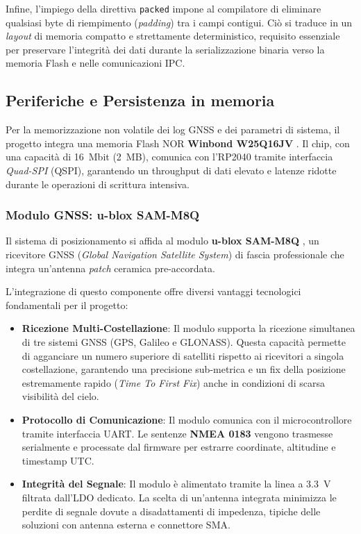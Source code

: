 Infine, l'impiego della direttiva \texttt{packed} impone al compilatore di eliminare qualsiasi byte di riempimento (\emph{padding}) tra i campi contigui. Ciò si traduce in un \emph{layout} di memoria compatto e strettamente deterministico, requisito essenziale per preservare l'integrità dei dati durante la serializzazione binaria verso la memoria Flash e nelle comunicazioni IPC.

\subsection{Periferiche e Persistenza in memoria}

Per la memorizzazione non volatile dei log GNSS e dei parametri di sistema, il progetto integra una memoria Flash NOR \textbf{Winbond W25Q16JV} \cite{w25q16_ds}. Il chip, con una capacità di \qty{16}{Mbit} (\qty{2}{MB}), comunica con l'RP2040 tramite interfaccia \textit{Quad-SPI} (QSPI), garantendo un throughput di dati elevato e latenze ridotte durante le operazioni di scrittura intensiva.

\subsubsection*{Modulo GNSS: u-blox SAM-M8Q}
Il sistema di posizionamento si affida al modulo \textbf{u-blox SAM-M8Q} \cite{sam_m8q_ds}, un ricevitore GNSS (\textit{Global Navigation Satellite System}) di fascia professionale che integra un'antenna \textit{patch} ceramica pre-accordata. 

L'integrazione di questo componente offre diversi vantaggi tecnologici fondamentali per il progetto:

\begin{itemize}
    \item \textbf{Ricezione Multi-Costellazione}: Il modulo supporta la ricezione simultanea di tre sistemi GNSS (GPS, Galileo e GLONASS). Questa capacità permette di agganciare un numero superiore di satelliti rispetto ai ricevitori a singola costellazione, garantendo una precisione sub-metrica e un fix della posizione estremamente rapido (\textit{Time To First Fix}) anche in condizioni di scarsa visibilità del cielo.
    \item \textbf{Protocollo di Comunicazione}: Il modulo comunica con il microcontrollore tramite interfaccia UART. Le sentenze \textbf{NMEA 0183} vengono trasmesse serialmente e processate dal firmware per estrarre coordinate, altitudine e timestamp UTC.
	\item \textbf{Integrità del Segnale}: Il modulo è alimentato tramite la linea a \qty{3.3}{V} filtrata dall'LDO dedicato. La scelta di un'antenna integrata minimizza le perdite di segnale dovute a disadattamenti di impedenza, tipiche delle soluzioni con antenna esterna e connettore SMA.
\end{itemize}

